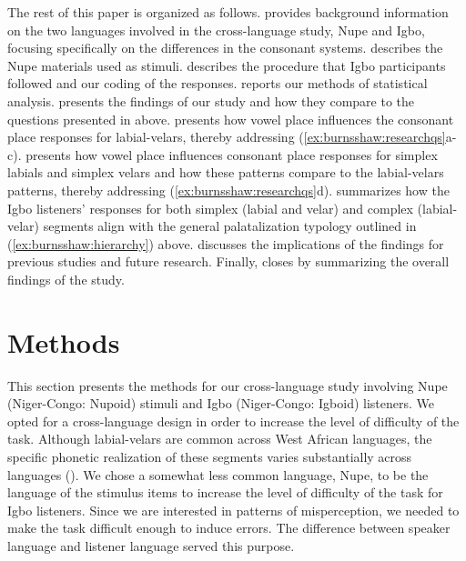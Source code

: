 \documentclass[output=paper,colorlinks,citecolor=brown
]{langscibook}
\begin{document}
The rest of this paper is organized as follows.  provides background information on the two languages involved in the cross-language study, Nupe and Igbo, focusing specifically on the differences in the consonant systems.  describes the Nupe materials used as stimuli.  describes the procedure that Igbo participants followed and our coding of the responses.  reports our methods of statistical analysis.  presents the findings of our study and how they compare to the questions presented in  above.  presents how vowel place influences the consonant place responses for labial-velars, thereby addressing (\ref{ex:burnsshaw:researchqs}a-c).  presents how vowel place influences consonant place responses for simplex labials and simplex velars and how these patterns compare to the labial-velars patterns, thereby addressing (\ref{ex:burnsshaw:researchqs}d).  summarizes how the Igbo listeners' responses for both simplex (labial and velar) and complex (labial-velar) segments align with the general palatalization typology outlined in (\ref{ex:burnsshaw:hierarchy}) above.  discusses the implications of the findings for previous studies and future research. Finally,  closes by summarizing the overall findings of the study.

\section{Methods}\label{sec:burnsshaw:Methods}
This section presents the methods for our cross-language study involving Nupe (Niger-Congo: Nupoid) stimuli and Igbo (Niger-Congo: Igboid) listeners. We opted for a  cross-language design in order to increase the level of difficulty of the task. Although labial-velars are common across West African languages, the specific phonetic realization of these segments varies substantially across languages (\citealt{Ladefoged1968}). We chose a somewhat less common language, Nupe, to be the language of the stimulus items to increase the level of difficulty of the task for Igbo listeners. Since we are interested in patterns of misperception, we needed to make the task difficult enough to induce errors. The difference between speaker language and listener language served this purpose.
\end{document}
